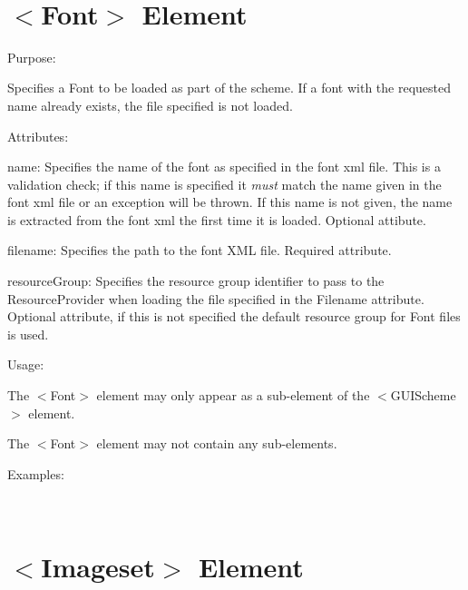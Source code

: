 ~\newline
 \hypertarget{xml_scheme_xml_scheme_font}{}\section{$<$\+Font$>$ Element}\label{xml_scheme_xml_scheme_font}

\begin{DoxyItemize}
\item Purpose\+:
\begin{DoxyItemize}
\item Specifies a Font to be loaded as part of the scheme. If a font with the requested name already exists, the file specified is not loaded.
\end{DoxyItemize}
\item Attributes\+:
\begin{DoxyItemize}
\item {\ttfamily name\+:} Specifies the name of the font as specified in the font xml file. This is a validation check; if this name is specified it {\itshape must} match the name given in the font xml file or an exception will be thrown. If this name is not given, the name is extracted from the font xml the first time it is loaded. Optional attibute.
\item {\ttfamily filename\+:} Specifies the path to the font X\+ML file. Required attribute.
\item {\ttfamily resource\+Group\+:} Specifies the resource group identifier to pass to the Resource\+Provider when loading the file specified in the {\ttfamily Filename} attribute. Optional attribute, if this is not specified the default resource group for Font files is used.
\end{DoxyItemize}
\item Usage\+:
\begin{DoxyItemize}
\item The $<$Font$>$ element may only appear as a sub-\/element of the $<$G\+U\+I\+Scheme$>$ element.
\item The $<$Font$>$ element may not contain any sub-\/elements.
\end{DoxyItemize}
\item Examples\+:
\end{DoxyItemize}

~\newline
 \hypertarget{xml_scheme_xml_scheme_imageset}{}\section{$<$\+Imageset$>$ Element}\label{xml_scheme_xml_scheme_imageset}

